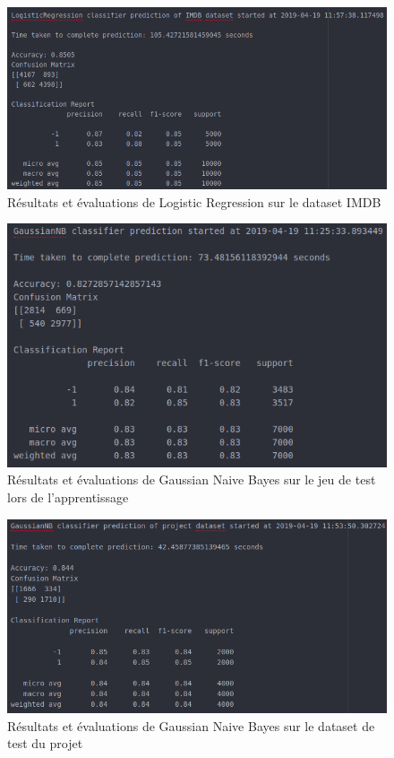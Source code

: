 \documentclass[12pt,a4paper]{report}
\theoremstyle{definition}
\begin{document}
\begin{appendices}
\begin{figure}[!ht]
  \centering
  \includegraphics[scale=0.5]{images/snapshots/predictions/logistic_regression/imdb_dataset_results.png}
  \caption{Résultats et évaluations de Logistic Regression sur le dataset IMDB}
  \label{fig:lr_imdb_dataset}
\end{figure}

\begin{figure}[!ht]
  \centering
  \includegraphics[scale=0.5]{images/snapshots/predictions/gaussian_naive_bayes/training_set_results.png}
  \caption{Résultats et évaluations de Gaussian Naive Bayes sur le jeu de test lors de l'apprentissage}
  \label{fig:gnb_fit_test}
\end{figure}

\begin{figure}[!ht]
  \centering
  \includegraphics[scale=0.5]{images/snapshots/predictions/gaussian_naive_bayes/project_dataset_results.png}
  \caption{Résultats et évaluations de Gaussian Naive Bayes sur le dataset de test du projet}
  \label{fig:gnb_project_dataset}
\end{figure}


\end{appendices}
\end{document}
